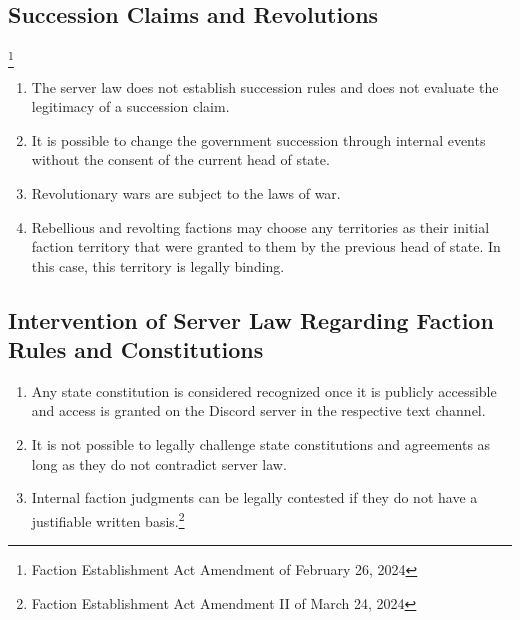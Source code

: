 \documentclass{article}
\begin{document}
\subsection{Succession Claims and Revolutions}\footnote{Faction Establishment Act Amendment of February 26, 2024}
\begin{enumerate}[(1)]
	\item The server law does not establish succession rules and does not evaluate the legitimacy of a succession claim.
	\item It is possible to change the government succession through internal events without the consent of the current head of state.
	\item Revolutionary wars are subject to the laws of war.
	\item Rebellious and revolting factions may choose any territories as their initial faction territory that were granted to them by the previous head of state. In this case, this territory is legally binding.
\end{enumerate}

\subsection{Intervention of Server Law Regarding Faction Rules and Constitutions}
\begin{enumerate}[(1)]
	\item Any state constitution is considered recognized once it is publicly accessible and access is granted on the Discord server in the respective text channel.
    \item It is not possible to legally challenge state constitutions and agreements as long as they do not contradict server law.
    \item Internal faction judgments can be legally contested if they do not have a justifiable written basis.\footnote{Faction Establishment Act Amendment II of March 24, 2024}
\end{enumerate}
\end{document}
